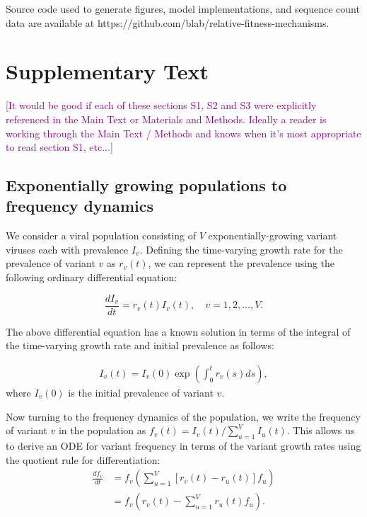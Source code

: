 \documentclass[11pt,oneside,letterpaper]{article}
\def\tbc#1{\textcolor{purple}{[#1]}}
\begin{document}
Source code used to generate figures, model implementations, and sequence count data are available at https://github.com/blab/relative-fitness-mechanisms.

\newpage

\section*{Supplementary Text}

\tbc{It would be good if each of these sections S1, S2 and S3 were explicitly referenced in the Main Text or Materials and Methods. Ideally a reader is working through the Main Text / Methods and knows when it's most appropriate to read section S1, etc...}

\subsection{Exponentially growing populations to frequency dynamics}\label{ssec:frequency_dynamics}

We consider a viral population consisting of $V$ exponentially-growing variant viruses each with prevalence $I_{v}$.
Defining the time-varying growth rate for the prevalence of variant $v$ as $r_{v}(t)$, we can represent the prevalence using the following ordinary differential equation:

\begin{equation} \label{eq:inhomo_exp_growth}
    \frac{d I_{v}}{d t} = r_{v}(t) I_{v}(t), \quad v = 1,2, \ldots, V.
\end{equation}

The above differential equation has a known solution in terms of the integral of the time-varying growth rate and initial prevalence as follows:

\begin{align*}
I_{v}(t) = I_{v}(0) \exp\left( \int_{0}^{t} r_{v}(s) ds\right),
\end{align*}
where $I_{v}(0)$ is the initial prevalence of variant $v$.

Now turning to the frequency dynamics of the population, we write the frequency of variant $v$ in the population as  $f_{v}(t) = I_{v}(t) / \sum_{u=1}^{V} I_{u}(t)$.
This allows us to derive an ODE for variant frequency in terms of the variant growth rates using the quotient rule for differentiation:
\begin{align*}
    \frac{d f_{v}}{d t} &= f_{v} \left( \sum_{u=1}^{V} [r_{v}(t) - r_{u}(t)] f_{u} \right)\\
                        &= f_{v} \left( r_{v}(t) - \sum_{u=1}^{V} r_{u}(t) f_{u} \right).
\end{align*}
\end{document}

